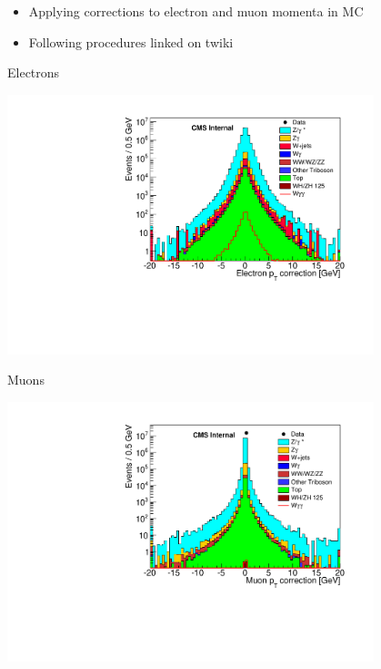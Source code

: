 \documentclass{beamer}
\begin{document}
 {

    \begin{itemize}
        \item Applying corrections to electron and muon momenta in MC
        \item Following procedures linked on twiki
    \end{itemize}

    \bc
        Electrons
   
        \includegraphics[width=0.8\textwidth]{Plots/electronPtCorrection.pdf}

        Muons

        \includegraphics[width=0.8\textwidth]{Plots/muonPtCorrection.pdf}

    \ec
}
\end{document}

